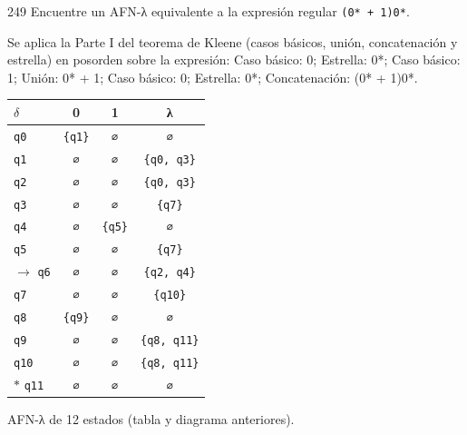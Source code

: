 \documentclass[11pt]{article}
\begin{document}
\begin{ejercicio}{249}{}
Encuentre un AFN-λ equivalente a la expresión regular \texttt{(0* + 1)0*}.
\end{ejercicio}
\proc Se aplica la Parte I del teorema de Kleene (casos básicos, unión, concatenación y estrella) en posorden sobre la expresión: Caso básico: 0; Estrella: 0*; Caso básico: 1; Unión: 0* + 1; Caso básico: 0; Estrella: 0*; Concatenación: (0* + 1)0*.
\begin{center}\small\begin{tabular}{lccc}\toprule
$\delta$ & 0 & 1 & λ \\\midrule
 \texttt{q0} & \texttt{\{q1\}} & \texttt{∅} & \texttt{∅} \\
 \texttt{q1} & \texttt{∅} & \texttt{∅} & \texttt{\{q0, q3\}} \\
 \texttt{q2} & \texttt{∅} & \texttt{∅} & \texttt{\{q0, q3\}} \\
 \texttt{q3} & \texttt{∅} & \texttt{∅} & \texttt{\{q7\}} \\
 \texttt{q4} & \texttt{∅} & \texttt{\{q5\}} & \texttt{∅} \\
 \texttt{q5} & \texttt{∅} & \texttt{∅} & \texttt{\{q7\}} \\
$\to$ \texttt{q6} & \texttt{∅} & \texttt{∅} & \texttt{\{q2, q4\}} \\
 \texttt{q7} & \texttt{∅} & \texttt{∅} & \texttt{\{q10\}} \\
 \texttt{q8} & \texttt{\{q9\}} & \texttt{∅} & \texttt{∅} \\
 \texttt{q9} & \texttt{∅} & \texttt{∅} & \texttt{\{q8, q11\}} \\
 \texttt{q10} & \texttt{∅} & \texttt{∅} & \texttt{\{q8, q11\}} \\
$*$ \texttt{q11} & \texttt{∅} & \texttt{∅} & \texttt{∅} \\
\bottomrule\end{tabular}\end{center}

\resp AFN-λ de 12 estados (tabla y diagrama anteriores).
\end{document}
